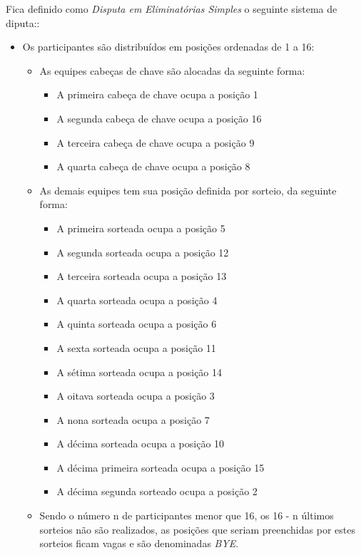 \noindent
Fica definido como \textit{Disputa em Eliminatórias Simples} o seguinte sistema de diputa::
\begin{itemize}[noitemsep]
	\item Os participantes são distribuídos em posições ordenadas de 1 a 16:
	\begin{itemize}[noitemsep]
		\item As equipes cabeças de chave são alocadas da seguinte forma:
		\begin{itemize}[noitemsep]
			\item A primeira cabeça de chave ocupa a posição 1
			\item A segunda cabeça de chave ocupa a posição 16
			\item A terceira cabeça de chave ocupa a posição 9
			\item A quarta cabeça de chave ocupa a posição 8
		\end{itemize}

		\item As demais equipes tem sua posição definida por sorteio, da seguinte forma:
		\begin{itemize}[noitemsep]
			\item A primeira sorteada ocupa a posição 5
			\item A segunda sorteada ocupa a posição 12
			\item A terceira sorteada ocupa a posição 13
			\item A quarta sorteada ocupa a posição 4
			\item A quinta sorteada ocupa a posição 6
			\item A sexta sorteada ocupa a posição 11
			\item A sétima sorteada ocupa a posição 14
			\item A oitava sorteada ocupa a posição 3
			\item A nona sorteada ocupa a posição 7
			\item A décima sorteada ocupa a posição 10
			\item A décima primeira sorteada ocupa a posição 15
			\item A décima segunda sorteado ocupa a posição 2
		\end{itemize}

		\item Sendo o número n de participantes menor que 16, os 16 - n últimos sorteios não são realizados, as posições que seriam preenchidas por estes sorteios ficam vagas e são denominadas \textit{BYE}.
	\end{itemize}


\end{itemize}
